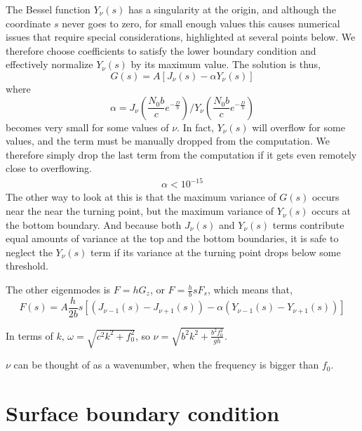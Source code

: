 \documentclass[11pt]{article}
\begin{document}
The Bessel function $Y_\nu(s)$ has a singularity at the origin, and although the coordinate $s$ never goes to zero, for small enough values this causes numerical issues that require special considerations, highlighted at several points below. We therefore choose coefficients to satisfy the lower boundary condition and effectively normalize $Y_\nu(s)$ by its maximum value. The solution is thus,
\begin{equation}
G(s) = A \left[ J_{\nu} \left( s \right) -   \alpha Y_{\nu} \left( s \right) \right]
\end{equation}
where
\begin{equation}
\alpha =   J_\nu\left(\frac{N_0 b}{c}e^{-\frac{D}{b}} \right) / Y_\nu\left(\frac{N_0 b}{c}e^{-\frac{D}{b}} \right) 
\end{equation}
becomes very small for some values of $\nu$. In fact, $Y_\nu(s)$ will overflow for some values, and the term must be manually dropped from the computation. We therefore simply drop the last term from the computation if it gets even remotely close to overflowing.
\begin{align}
  \alpha < 10^{-15}
\end{align}
The other way to look at this is that the maximum variance of $G(s)$ occurs near the near the turning point, but the maximum variance of $Y_\nu(s)$ occurs at the bottom boundary. And because both $J_\nu(s)$ and $Y_\nu(s)$ terms contribute equal amounts of variance at the top and the bottom boundaries, it is safe to neglect the $Y_\nu(s)$ term if its variance at the turning point drops below some threshold.

The other eigenmodes is $F=hG_z$, or $F=\frac{h}{b} s F_s$, which means that,
\begin{equation}
F(s) = A \frac{h}{ 2 b }s  \left[   \left( J_{\nu-1} \left( s\right) - J_{\nu+1} \left( s \right) \right) - \alpha \left(Y_{\nu-1} \left( s \right) - Y_{\nu+1} \left( s \right) \right) \right]
\end{equation}

In terms of $k$, $\omega = \sqrt{c^2 k^2 + f_0^2}$, so $\nu = \sqrt{b^2 k^2 + \frac{b^2 f_0^2}{gh}}$.

$\nu$ can be thought of as a wavenumber, when the frequency is bigger than $f_0$. 


%
\section{Surface boundary condition}
%
\end{document}
